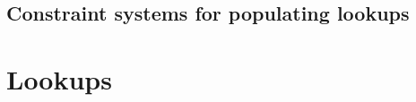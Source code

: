 \subsection{Constraint systems for populating lookups}                                                    \label{oob: specialized constraints}

                                      

                                  

\section{Lookups}                                                                                     \label{oob: lookups}
